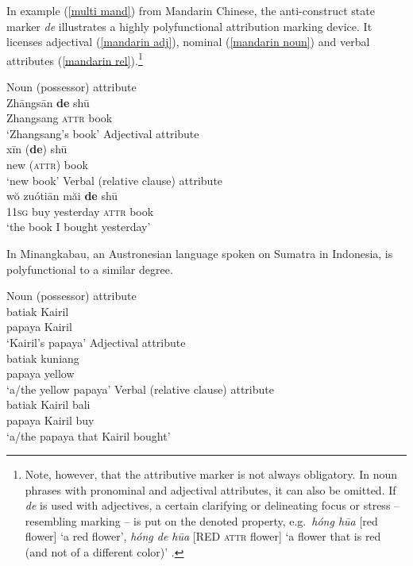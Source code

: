 In example (\ref{multi mand}) from Mandarin Chinese, the anti\hyp{}construct state marker \textit{de} illustrates a highly polyfunctional attribution marking device. It licenses adjectival (\ref{mandarin adj}), nominal (\ref{mandarin noun}) and verbal attributes (\ref{mandarin rel}).\footnote{Note, however, that the attributive marker is not always obligatory. In noun phrases with pronominal and adjectival attributes, it can also be omitted. If \textit{de} is used with adjectives, a certain clarifying or delineating focus or stress – resembling  marking – is put on the denoted property, e.g.~\textit{hóng hūa} [red flower] ‘a red flower’, \textit{hóng de hūa} [RED \textsc{attr} flower] ‘a flower that is red (and not of a different color)’ \citep[119–123]{li-etal1981}.}
\begin{exe}
\ex
{} \label{multi mand}
\begin{xlist}
\ex	\rm{Noun (possessor) attribute}\\
\gll	Zhāngsān 	\textbf{de} 	shū\\
	Zhangsang 	{\textsc{attr}} 	book\\
\glt	‘Zhangsang's book’\label{mandarin noun}
\ex	\rm{Adjectival attribute}\\
\gll	xīn 		(\textbf{de}) 	shū\\
	new	 	({\textsc{attr}}) 	book\\
\glt	‘new book’\label{mandarin adj}
\ex	\rm{Verbal (relative clause) attribute}\\
\gll	wŏ zuótiān 	măi 	\textbf{de} 	shū\\
	1\textsc{1sg} 	buy	yesterday 	{\textsc{attr}} 	book\\
\glt	‘the book I bought yesterday’\label{mandarin rel}
\end{xlist}
\end{exe}
In Minangkabau, an Austronesian language spoken on Sumatra in Indonesia,  is polyfunctional to a similar degree.
\begin{exe}
\ex 
{} \label{multi minangkabau}
\begin{xlist}
\ex \rm{Noun (possessor) attribute}\\
\gll	batiak Kairil\\
	papaya Kairil\\
\glt	‘Kairil's papaya’
\ex \rm{Adjectival attribute}\\
\gll	batiak kuniang\\
	papaya yellow\\
\glt	‘a/the yellow papaya’
\ex \rm{Verbal (relative clause) attribute}\\
\gll	batiak Kairil bali\\
	papaya Kairil buy\\
\glt	‘a/the papaya that Kairil bought’
\end{xlist}
\end{exe}

